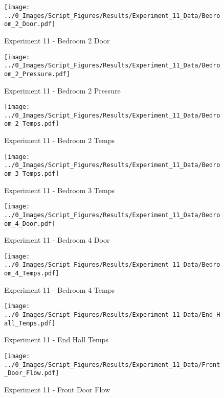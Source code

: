 	\begin{figure}[H]
		\centering
		\texttt{[image: ../0\_Images/Script\_Figures/Results/Experiment\_11\_Data/Bedroom\_2\_Door.pdf]}
		\caption[]{Experiment 11 - Bedroom 2 Door}
	\end{figure}
 
	\clearpage

	\begin{figure}[H]
		\centering
		\texttt{[image: ../0\_Images/Script\_Figures/Results/Experiment\_11\_Data/Bedroom\_2\_Pressure.pdf]}
		\caption[]{Experiment 11 - Bedroom 2 Pressure}
	\end{figure}
 

	\begin{figure}[H]
		\centering
		\texttt{[image: ../0\_Images/Script\_Figures/Results/Experiment\_11\_Data/Bedroom\_2\_Temps.pdf]}
		\caption[]{Experiment 11 - Bedroom 2 Temps}
	\end{figure}
 
	\clearpage

	\begin{figure}[H]
		\centering
		\texttt{[image: ../0\_Images/Script\_Figures/Results/Experiment\_11\_Data/Bedroom\_3\_Temps.pdf]}
		\caption[]{Experiment 11 - Bedroom 3 Temps}
	\end{figure}
 

	\begin{figure}[H]
		\centering
		\texttt{[image: ../0\_Images/Script\_Figures/Results/Experiment\_11\_Data/Bedroom\_4\_Door.pdf]}
		\caption[]{Experiment 11 - Bedroom 4 Door}
	\end{figure}
 
	\clearpage

	\begin{figure}[H]
		\centering
		\texttt{[image: ../0\_Images/Script\_Figures/Results/Experiment\_11\_Data/Bedroom\_4\_Temps.pdf]}
		\caption[]{Experiment 11 - Bedroom 4 Temps}
	\end{figure}
 

	\begin{figure}[H]
		\centering
		\texttt{[image: ../0\_Images/Script\_Figures/Results/Experiment\_11\_Data/End\_Hall\_Temps.pdf]}
		\caption[]{Experiment 11 - End Hall Temps}
	\end{figure}
 
	\clearpage

	\begin{figure}[H]
		\centering
		\texttt{[image: ../0\_Images/Script\_Figures/Results/Experiment\_11\_Data/Front\_Door\_Flow.pdf]}
		\caption[]{Experiment 11 - Front Door Flow}
	\end{figure}
 

